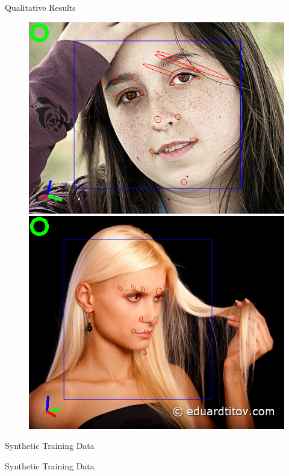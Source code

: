 \documentclass{beamer}
\begin{document}
\begin{frame}{Qualitative Results}
\begin{figure}
\fi
\includegraphics[scale=0.25]{fig/mean_example_pres6}
\includegraphics[scale=0.25]{fig/mean_example_pres}
\end{figure}
\end{frame}

\begin{frame}{Synthetic Training Data}
\begin{center}
\begin{huge}
Synthetic Training Data
\end{huge}
\end{center}
\end{frame}
\end{document}
